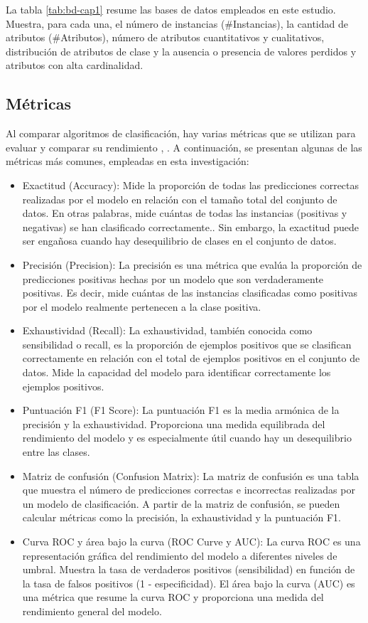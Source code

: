 La tabla \ref{tab:bd-cap1} resume las bases de datos empleados en este estudio. Muestra, para cada una, el número de instancias (\#Instancias), la cantidad de atributos (\#Atributos), número de atributos cuantitativos y cualitativos, distribución de atributos de clase y la ausencia o presencia de valores perdidos y atributos con alta cardinalidad.

\subsection{Métricas}
Al comparar algoritmos de clasificación, hay varias métricas que se utilizan para evaluar y comparar su rendimiento \citep{geron2022hands}, \citep{hastie2009elements}. A continuación, se presentan algunas de las métricas más comunes, empleadas en esta investigación:
\begin{itemize}
	\item Exactitud (Accuracy): Mide la proporción de todas las predicciones correctas realizadas por el modelo en relación con el tamaño total del conjunto de datos. En otras palabras, mide cuántas de todas las instancias (positivas y negativas) se han clasificado correctamente.. Sin embargo, la exactitud puede ser engañosa cuando hay desequilibrio de clases en el conjunto de datos.
	\item Precisión (Precision): La precisión es una métrica que evalúa la proporción de predicciones positivas hechas por un modelo que son verdaderamente positivas. Es decir, mide cuántas de las instancias clasificadas como positivas por el modelo realmente pertenecen a la clase positiva. 
	\item Exhaustividad (Recall): La exhaustividad, también conocida como sensibilidad o recall, es la proporción de ejemplos positivos que se clasifican correctamente en relación con el total de ejemplos positivos en el conjunto de datos. Mide la capacidad del modelo para identificar correctamente los ejemplos positivos.
	\item Puntuación F1 (F1 Score): La puntuación F1 es la media armónica de la precisión y la exhaustividad. Proporciona una medida equilibrada del rendimiento del modelo y es especialmente útil cuando hay un desequilibrio entre las clases.
	\item Matriz de confusión (Confusion Matrix): La matriz de confusión es una tabla que muestra el número de predicciones correctas e incorrectas realizadas por un modelo de clasificación. A partir de la matriz de confusión, se pueden calcular métricas como la precisión, la exhaustividad y la puntuación F1.
	\item Curva ROC y área bajo la curva (ROC Curve y AUC): La curva ROC es una representación gráfica del rendimiento del modelo a diferentes niveles de umbral. Muestra la tasa de verdaderos positivos (sensibilidad) en función de la tasa de falsos positivos (1 - especificidad). El área bajo la curva (AUC) es una métrica que resume la curva ROC y proporciona una medida del rendimiento general del modelo.
\end{itemize}

